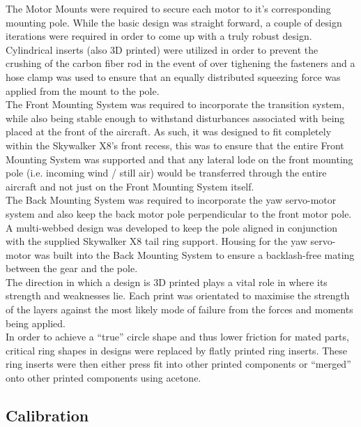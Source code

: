 The Motor Mounts were required to secure each motor to it's corresponding mounting pole. While the basic design was straight forward, a couple of design iterations were required in order to come up with a truly robust design. Cylindrical inserts (also 3D printed) were utilized in order to prevent the crushing of the carbon fiber rod in the event of over tighening the fasteners and a hose clamp was used to ensure that an equally distributed squeezing force was applied from the mount to the pole.\\
The Front Mounting System was required to incorporate the transition system, while also being stable enough to withstand disturbances associated with being placed at the front of the aircraft. As such, it was designed to fit completely within the Skywalker X8's front recess, this was to ensure that the entire Front Mounting System was supported and that any lateral lode on the front mounting pole (i.e. incoming wind / still air) would be transferred through the entire aircraft and not just on the Front Mounting System itself.\\
The Back Mounting System was required to incorporate the yaw servo-motor system and also keep the back motor pole perpendicular to the front motor pole. A multi-webbed design was developed to keep the pole aligned in conjunction with the supplied Skywalker X8 tail ring support. Housing for the yaw servo-motor was built into the Back Mounting System to ensure a backlash-free mating between the gear and the pole.\\
The direction in which a design is 3D printed plays a vital role in where its strength and weaknesses lie. Each print was orientated to maximise the strength of the layers against the most likely mode of failure from the forces and moments being applied.\\
In order to achieve a ``true'' circle shape and thus lower friction for mated parts, critical ring shapes in designs were replaced by flatly printed ring inserts. These ring inserts were then either press fit into other printed components or ``merged'' onto other printed components using acetone. 


\subsection{Calibration}
